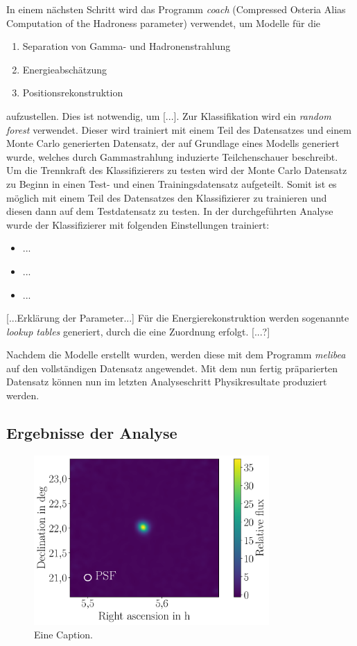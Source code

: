 In einem nächsten Schritt wird das Programm \textit{coach} (Compressed Osteria
Alias Computation of the Hadroness parameter) verwendet, um Modelle für die
\begin{enumerate}
  \item Separation von Gamma- und Hadronenstrahlung
  \item Energieabschätzung
  \item Positionsrekonstruktion
\end{enumerate}
aufzustellen. Dies ist notwendig, um [...]. Zur Klassifikation wird ein
\textit{random forest} verwendet. Dieser wird trainiert mit einem Teil des
Datensatzes und einem Monte Carlo generierten Datensatz, der auf Grundlage eines
Modells generiert wurde, welches durch Gammastrahlung induzierte Teilchenschauer
beschreibt. Um die Trennkraft des Klassifizierers zu testen wird der Monte
Carlo Datensatz zu Beginn in einen Test- und einen Trainingsdatensatz
aufgeteilt. Somit ist es möglich mit einem Teil des Datensatzes den
Klassifizierer zu trainieren und diesen dann auf dem Testdatensatz zu testen.
In der durchgeführten Analyse wurde der Klassifizierer mit folgenden
Einstellungen trainiert:
\begin{itemize}
  \item ...
  \item ...
  \item ...
\end{itemize}
[...Erklärung der Parameter...]
Für die Energierekonstruktion werden sogenannte \textit{lookup tables}
generiert, durch die eine Zuordnung erfolgt. [...?]

Nachdem die Modelle erstellt wurden, werden diese mit dem Programm
\textit{melibea} auf den vollständigen Datensatz angewendet. Mit dem nun fertig
präparierten Datensatz können nun im letzten Analyseschritt Physikresultate
produziert werden.

\subsection{Ergebnisse der Analyse}

\begin{figure}
  \centering
  \includegraphics[width=0.8\textwidth]{figures/caspar_flux_skymap.pdf}
  \caption{Eine Caption.}
\end{figure}

